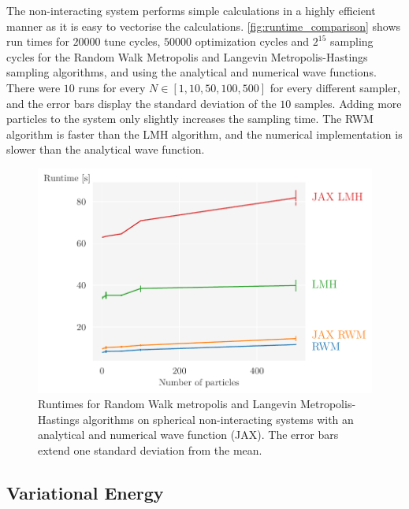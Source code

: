 
The non-interacting system performs simple calculations in a highly efficient manner as it is easy to vectorise the calculations. \autoref{fig:runtime_comparison} shows run times for $20000$ tune cycles, $50000$ optimization cycles and $2^{15}$ sampling cycles for the Random Walk Metropolis and Langevin Metropolis-Hastings sampling algorithms, and using the analytical and numerical wave functions. There were $10$ runs for every $N\in[1, 10, 50, 100, 500]$ for every different sampler, and the error bars display the standard deviation of the $10$ samples. Adding more particles to the system only slightly increases the sampling time. The RWM algorithm is faster than the LMH algorithm, and the numerical implementation is slower than the analytical wave function.  

\begin{figure}[!htb]
\begin{center}\includegraphics[width=\textwidth]{latex/figures/runtime_comparisons.pdf}
\end{center}
\caption{Runtimes for Random Walk metropolis and Langevin Metropolis-Hastings algorithms on spherical non-interacting systems with an analytical and numerical wave function (JAX). The error bars extend one standard deviation from the mean.}
\label{fig:runtime_comparison}
\end{figure}

\subsection{Variational Energy}

